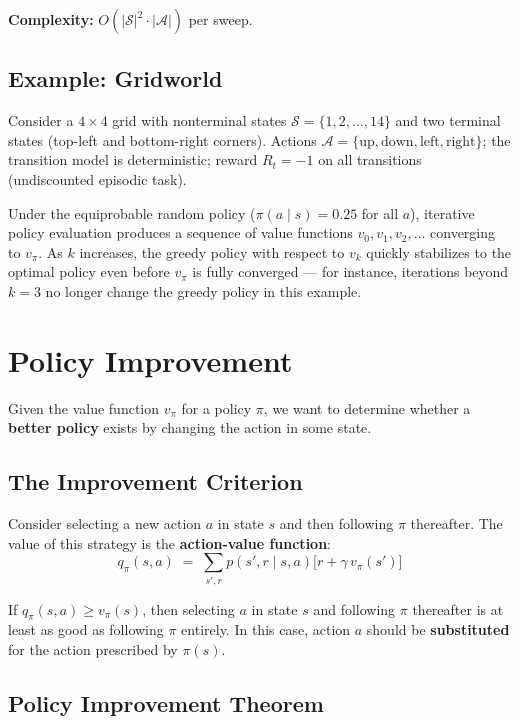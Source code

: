 \documentclass[11pt,a4paper]{article}
\theoremstyle{definition}
\theoremstyle{plain}
\theoremstyle{remark}
\begin{document}
\textbf{Complexity:} $O(|\mathcal{S}|^2 \cdot |\mathcal{A}|)$ per sweep.

\subsection{Example: Gridworld}

Consider a $4 \times 4$ grid with nonterminal states $\mathcal{S} = \{1, 2, \ldots, 14\}$ and two terminal states (top-left and bottom-right corners). Actions $\mathcal{A} = \{\text{up}, \text{down}, \text{left}, \text{right}\}$; the transition model is deterministic; reward $R_t = -1$ on all transitions (undiscounted episodic task).

Under the equiprobable random policy ($\pi(a \mid s) = 0.25$ for all $a$), iterative policy evaluation produces a sequence of value functions $v_0, v_1, v_2, \ldots$ converging to $v_\pi$. As $k$ increases, the greedy policy with respect to $v_k$ quickly stabilizes to the optimal policy even before $v_\pi$ is fully converged --- for instance, iterations beyond $k = 3$ no longer change the greedy policy in this example.

\section{Policy Improvement}

Given the value function $v_\pi$ for a policy $\pi$, we want to determine whether a \textbf{better policy} exists by changing the action in some state.

\subsection{The Improvement Criterion}

Consider selecting a new action $a$ in state $s$ and then following $\pi$ thereafter. The value of this strategy is the \textbf{action-value function}:
\[
    q_\pi(s, a) \;=\; \sum_{s', r} p(s', r \mid s, a) \bigl[r + \gamma\, v_\pi(s')\bigr]
\]

If $q_\pi(s, a) \geq v_\pi(s)$, then selecting $a$ in state $s$ and following $\pi$ thereafter is at least as good as following $\pi$ entirely. In this case, action $a$ should be \textbf{substituted} for the action prescribed by $\pi(s)$.

\subsection{Policy Improvement Theorem}
\end{document}
